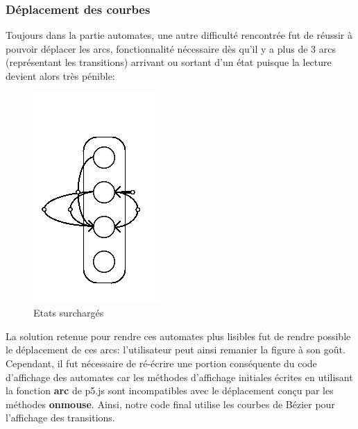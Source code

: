 \subsubsection{Déplacement des courbes}
Toujours dans la partie automates, une autre difficulté rencontrée fut de réussir à pouvoir déplacer les arcs, fonctionnalité nécessaire dès qu'il y a plus de $3$ arcs (représentant les transitions) arrivant ou sortant d'un état puisque la lecture devient alors très pénible:
\newpage
\begin{figure}
  \centering
\includegraphics[scale=1]{images/arcs.PNG} 
\caption{Etats surchargés}
\end{figure}
La solution retenue pour rendre ces automates plus lisibles fut de rendre possible le déplacement de ces arcs: l'utilisateur peut ainsi remanier la figure à son goût. Cependant, il fut nécessaire de ré-écrire une portion conséquente du code d'affichage des automates car les méthodes d'affichage initiales écrites en utilisant la fonction \textbf{arc} de p5.js sont incompatibles avec le déplacement conçu par les méthodes \textbf{onmouse}. Ainsi, notre code final utilise les courbes de Bézier pour l'affichage des transitions.


\bigbreak
